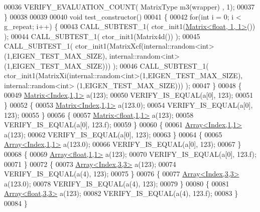 \begin{DoxyCode}
00036   VERIFY\_EVALUATION\_COUNT( MatrixType m3(wrapper) , 1);
00037 \}
00038 
00039 
00040 \textcolor{keywordtype}{void} test\_constructor()
00041 \{
00042   \textcolor{keywordflow}{for}(\textcolor{keywordtype}{int} i = 0; i < g\_repeat; i++) \{
00043     CALL\_SUBTEST\_1( ctor\_init1(\hyperlink{group___core___module_class_eigen_1_1_matrix}{Matrix<float, 1, 1>}()) );
00044     CALL\_SUBTEST\_1( ctor\_init1(Matrix4d()) );
00045     CALL\_SUBTEST\_1( ctor\_init1(MatrixXcf(internal::random<int>(1,EIGEN\_TEST\_MAX\_SIZE), 
      internal::random<int>(1,EIGEN\_TEST\_MAX\_SIZE))) );
00046     CALL\_SUBTEST\_1( ctor\_init1(MatrixXi(internal::random<int>(1,EIGEN\_TEST\_MAX\_SIZE), internal::random<int>
      (1,EIGEN\_TEST\_MAX\_SIZE))) );
00047   \}
00048   \{
00049     \hyperlink{group___core___module_class_eigen_1_1_matrix}{Matrix<Index,1,1>} a(123);
00050     VERIFY\_IS\_EQUAL(a[0], 123);
00051   \}
00052   \{
00053     \hyperlink{group___core___module_class_eigen_1_1_matrix}{Matrix<Index,1,1>} a(123.0);
00054     VERIFY\_IS\_EQUAL(a[0], 123);
00055   \}
00056   \{
00057     \hyperlink{group___core___module_class_eigen_1_1_matrix}{Matrix<float,1,1>} a(123);
00058     VERIFY\_IS\_EQUAL(a[0], 123.f);
00059   \}
00060   \{
00061     \hyperlink{group___core___module_class_eigen_1_1_array}{Array<Index,1,1>} a(123);
00062     VERIFY\_IS\_EQUAL(a[0], 123);
00063   \}
00064   \{
00065     \hyperlink{group___core___module_class_eigen_1_1_array}{Array<Index,1,1>} a(123.0);
00066     VERIFY\_IS\_EQUAL(a[0], 123);
00067   \}
00068   \{
00069     \hyperlink{group___core___module_class_eigen_1_1_array}{Array<float,1,1>} a(123);
00070     VERIFY\_IS\_EQUAL(a[0], 123.f);
00071   \}
00072   \{
00073     \hyperlink{group___core___module_class_eigen_1_1_array}{Array<Index,3,3>} a(123);
00074     VERIFY\_IS\_EQUAL(a(4), 123);
00075   \}
00076   \{
00077     \hyperlink{group___core___module_class_eigen_1_1_array}{Array<Index,3,3>} a(123.0);
00078     VERIFY\_IS\_EQUAL(a(4), 123);
00079   \}
00080   \{
00081     \hyperlink{group___core___module_class_eigen_1_1_array}{Array<float,3,3>} a(123);
00082     VERIFY\_IS\_EQUAL(a(4), 123.f);
00083   \}
00084 \}
\end{DoxyCode}
